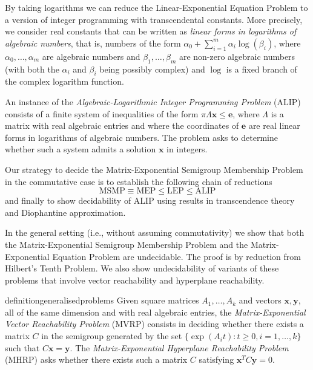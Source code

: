 \documentclass[format=acmsmall, review=false, screen=true]{acmart}
\newcommand{\myvector}{\boldsymbol}
\begin{document}
By taking logarithms we can reduce the Linear-Exponential Equation Problem
to a version of integer programming with transcendental constants.
More precisely, we consider real constants that can be written as
\emph{linear forms in logarithms of algebraic numbers}, that is,
numbers of the form $\alpha_0+\sum_{i=1}^m \alpha_i\log(\beta_i)$,
where $\alpha_0,\ldots,\alpha_m$ are algebraic numbers and
$\beta_1,\ldots,\beta_m$ are non-zero algebraic numbers (with both the
$\alpha_i$ and $\beta_i$ being possibly complex) and $\log$ is a fixed
branch of the complex logarithm function.
\begin{definition}
An instance of the \emph{Algebraic-Logarithmic Integer Programming
  Problem} (ALIP) consists of a finite system of inequalities of the form
$\pi \Lambda \myvector{x} \leq \myvector{e}$,
where $\Lambda$ is a matrix with real algebraic entries and
where the coordinates of $\myvector{e}$ are real linear forms in
logarithms of algebraic numbers. The problem asks to determine whether
such a system admits a solution $\myvector{x}$ in integers.
\end{definition}

Our strategy to decide the Matrix-Exponential Semigroup
Membership Problem in the commutative case is to establish the
following chain of reductions
\begin{equation*}
\mbox{MSMP} \equiv \mbox{MEP} \leq \mbox{LEP} \leq \mbox{ALIP} 
\end{equation*}
and finally to show decidability of ALIP using results in transcendence
theory and Diophantine approximation.

In the general setting (i.e., without assuming commutativity) we show
that both the Matrix-Exponential Semigroup Membership Problem and the
Matrix-Exponential Equation Problem are undecidable.  The proof is by
reduction from Hilbert's Tenth Problem.  We also show undecidability
of variants of these problems that involve vector reachability and
hyperplane reachability.

\begin{restatable}{definition}{generalisedproblems}
\label{def:generalised-problems}
Given square matrices $A_{1}, \ldots, A_{k}$ and vectors
$\myvector{x}, \myvector{y}$, all of the same dimension and with real
algebraic entries, the \emph{Matrix-Exponential Vector Reachability
  Problem} (MVRP) consists in deciding whether there exists a matrix
$C$ in the semigroup generated by the set
$\lbrace \exp(A_{i} t ): t \geq 0, i = 1,
\ldots, k \rbrace$ such that $C\myvector{x} = \myvector{y}$. 
The \emph{Matrix-Exponential Hyperplane Reachability Problem} (MHRP)
asks whether there exists such a matrix $C$ satisfying
$\myvector{x}^{T} C \myvector{y} = 0$.
\end{restatable}
\end{document}
